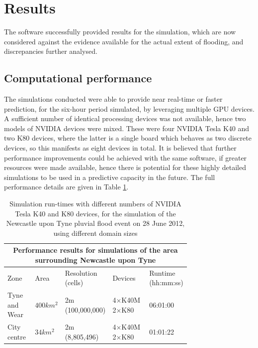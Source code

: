 \section{Results}

The software successfully provided results for the simulation, which are now considered against the evidence available for the actual extent of flooding, and discrepancies further analysed.

\subsection{Computational performance}

The simulations conducted were able to provide near real-time or faster prediction, for the six-hour period simulated, by leveraging multiple GPU devices. A sufficient number of identical processing devices was not available, hence two models of NVIDIA devices were mixed. These were four NVIDIA Tesla K40 and two K80 devices, where the latter is a single board which behaves as two discrete devices, so this manifests as eight devices in total. It is believed that further performance improvements could be achieved with the same software, if greater resources were made available, hence there is potential for these highly detailed simulations to be used in a predictive capacity in the future. The full performance details are given in Table \ref{PerformanceResults_MultiGPU_Newcastle}.

\begin{table}[tbp]
	\small
	\centering
	\caption{Simulation run-times with different numbers of NVIDIA Tesla K40 and K80 devices, for the simulation of the Newcastle upon Tyne pluvial flood event on 28 June 2012, using different domain sizes}
	\label{PerformanceResults_MultiGPU_Newcastle}
	\begin{tabular}{p{0.15\linewidth}p{0.08\linewidth}p{0.15\linewidth}p{0.2\linewidth}p{0.15\linewidth}}
		\hline
		\multicolumn{5}{c}{\textbf{Performance results for simulations of the area surrounding Newcastle upon Tyne}} \\
		\hline
		Zone		 		& Area					& Resolution (cells)	& Devices						& Runtime (hh:mm:ss)	\\
		\hline
		Tyne and Wear		& $400 km^{2}$			& 2m (100,000,000)		& 4$\times$K40M 2$\times$K80	& 06:01:00				\\
		City centre			& $34 km^{2}$			& 2m (8,805,496)		& 4$\times$K40M 2$\times$K80	& 01:01:22				\\
		\hline
	\end{tabular}
\end{table}

